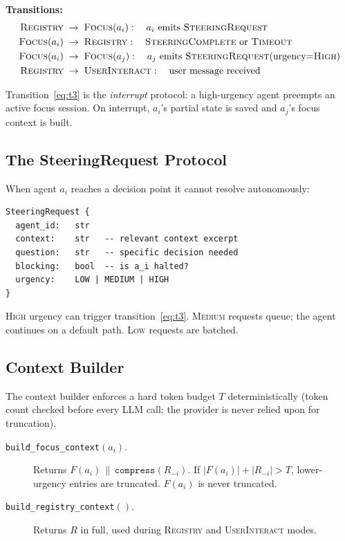 \documentclass{article}
\begin{document}
\noindent\textbf{Transitions:}
\begin{align}
  \textsc{Registry} &\;\to\; \textsc{Focus}(a_i): \quad
    a_i \text{ emits } \textsc{SteeringRequest} \label{eq:t1}\\
  \textsc{Focus}(a_i) &\;\to\; \textsc{Registry}: \quad
    \textsc{SteeringComplete} \text{ or } \textsc{Timeout} \label{eq:t2}\\
  \textsc{Focus}(a_i) &\;\to\; \textsc{Focus}(a_j): \quad
    a_j \text{ emits } \textsc{SteeringRequest}(\text{urgency}{=}\textsc{High}) \label{eq:t3}\\
  \textsc{Registry} &\;\to\; \textsc{UserInteract}: \quad
    \text{user message received} \label{eq:t4}
\end{align}

Transition~\eqref{eq:t3} is the \emph{interrupt} protocol:
a high-urgency agent preempts an active focus session.
On interrupt, $a_i$'s partial state is saved and $a_j$'s focus context
is built.

\subsection{The SteeringRequest Protocol}
\label{sec:protocol}

When agent $a_i$ reaches a decision point it cannot resolve autonomously:

\begin{lstlisting}
SteeringRequest {
  agent_id:   str
  context:    str   -- relevant context excerpt
  question:   str   -- specific decision needed
  blocking:   bool  -- is a_i halted?
  urgency:    LOW | MEDIUM | HIGH
}
\end{lstlisting}

\textsc{High} urgency can trigger transition~\eqref{eq:t3}.
\textsc{Medium} requests queue; the agent continues on a default path.
\textsc{Low} requests are batched.

\subsection{Context Builder}
\label{sec:context_builder}

The context builder enforces a hard token budget $T$ deterministically
(token count checked before every LLM call; the provider is never relied
upon for truncation).

\begin{description}
  \item[\texttt{build\_focus\_context}$(a_i)$.]
  Returns $F(a_i) \,\|\, \texttt{compress}(R_{-i})$.
  If $|F(a_i)| + |R_{-i}| > T$, lower-urgency entries are truncated.
  $F(a_i)$ is never truncated.

  \item[\texttt{build\_registry\_context}$()$.]
  Returns $R$ in full, used during \textsc{Registry} and
  \textsc{UserInteract} modes.
\end{description}
\end{document}
